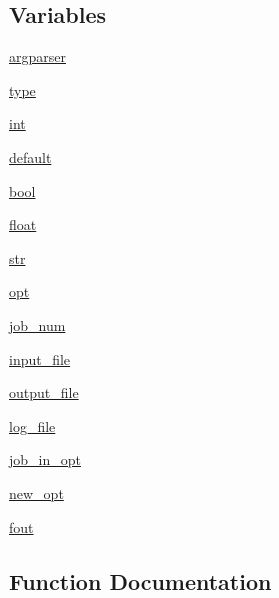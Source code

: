 \subsection*{Variables}
\begin{DoxyCompactItemize}
\item 
\hyperlink{namespacegraph__world2_1_1train_a28914dc685301ea70d35554dc0293486}{argparser}
\item 
\hyperlink{namespacegraph__world2_1_1train_a5483dc050b195034e046160fcc2155c5}{type}
\item 
\hyperlink{namespacegraph__world2_1_1train_ae777b30e4de8f0cdfc26bfda0c01b316}{int}
\item 
\hyperlink{namespacegraph__world2_1_1train_aa15c4b5001beb863ac4144ec68b832a9}{default}
\item 
\hyperlink{namespacegraph__world2_1_1train_adcfd197260a746eeb73a295520831582}{bool}
\item 
\hyperlink{namespacegraph__world2_1_1train_a9843eaa25215aba91f3f4b223dbb2049}{float}
\item 
\hyperlink{namespacegraph__world2_1_1train_ad6e658a468af9626e8b47490972d33a4}{str}
\item 
\hyperlink{namespacegraph__world2_1_1train_a286634b8300deedee0924d4ecac34fa6}{opt}
\item 
\hyperlink{namespacegraph__world2_1_1train_af8a4335a70104bebca62cb53adba47f9}{job\+\_\+num}
\item 
\hyperlink{namespacegraph__world2_1_1train_a3881ea088d1a9bfa45c2a1e496b84fe4}{input\+\_\+file}
\item 
\hyperlink{namespacegraph__world2_1_1train_aaa28465c643e1e44899c580e3cb09469}{output\+\_\+file}
\item 
\hyperlink{namespacegraph__world2_1_1train_ab4fed977b76754e4f0d9b2593205e54b}{log\+\_\+file}
\item 
\hyperlink{namespacegraph__world2_1_1train_a0dbc2533a58165ecd79f668f2889cf3e}{job\+\_\+in\+\_\+opt}
\item 
\hyperlink{namespacegraph__world2_1_1train_a87df49e5955f1677c3d285abb83ad60d}{new\+\_\+opt}
\item 
\hyperlink{namespacegraph__world2_1_1train_a098927108f0006868a4f333d6ce02443}{fout}
\end{DoxyCompactItemize}


\subsection{Function Documentation}
\mbox{\label{namespacegraph__world2_1_1train_a4a2155646856189e143dbc828baef945}} 
